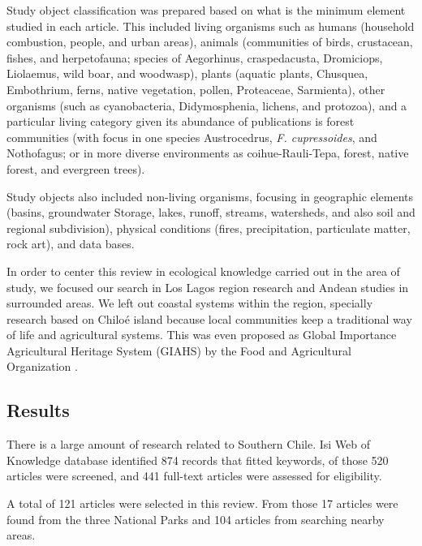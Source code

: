 \documentclass[]{article}
\begin{document}
Study object classification was prepared based on what is the minimum element studied in each article. This included living organisms such as humans (household combustion, people, and urban areas), animals (communities of birds, crustacean, fishes, and herpetofauna; species of Aegorhinus, craspedacusta, Dromiciops, Liolaemus, wild boar, and woodwasp), plants (aquatic plants, Chusquea, Embothrium, ferns, native vegetation, pollen, Proteaceae, Sarmienta), other organisms (such as cyanobacteria, Didymosphenia, lichens, and protozoa), and a particular living category given its abundance of publications is forest communities (with focus in one species Austrocedrus, \emph{F. cupressoides}, and Nothofagus; or in more diverse environments as coihue-Rauli-Tepa, forest, native forest, and evergreen trees).

Study objects also included non-living organisms, focusing in geographic elements (basins, groundwater Storage, lakes, runoff, streams, watersheds, and also soil and regional subdivision), physical conditions (fires, precipitation, particulate matter, rock art), and data bases.

In order to center this review in ecological knowledge carried out in the area of study, we focused our search in Los Lagos region research and Andean studies in surrounded areas. We left out coastal systems within the region, specially research based on Chiloé island because local communities keep a traditional way of life and agricultural systems. This was even proposed as Global Importance Agricultural Heritage System (GIAHS) by the Food and Agricultural Organization \citep{FAO2003Chiloe, FAO2008Chiloe}.

\hypertarget{results}{%
\subsection{Results}\label{results}}

There is a large amount of research related to Southern Chile. Isi Web of Knowledge database identified 874 records that fitted keywords, of those 520 articles were screened, and 441 full-text articles were assessed for eligibility.

A total of 121 articles were selected in this review. From those 17 articles were found from the three National Parks and 104 articles from searching nearby areas.
\end{document}
